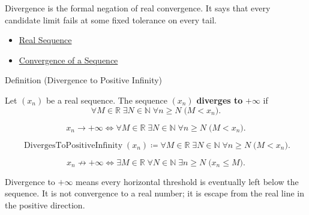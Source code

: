 \begin{remark*}[Interpretation]
Divergence is the formal negation of real convergence. It says that every
candidate limit fails at some fixed tolerance on every tail.
\end{remark*}

\begin{dependencies}
\begin{itemize}
  \item \hyperref[def:real-sequence]{Real Sequence}
  \item \hyperref[def:convergent-sequence]{Convergence of a Sequence}
\end{itemize}
\end{dependencies}


\begin{definitionbox}{Definition (Divergence to Positive Infinity)}
\begin{definition}
\label{def:diverges-to-positive-infinity}
Let $(x_n)$ be a real sequence. The sequence $(x_n)$ \textbf{diverges to}
$+\infty$ if
\[
  \forall M\in\mathbb{R}\;\exists N\in\mathbb{N}\;\forall n\ge N
  \;\bigl(M<x_n\bigr).
\]
\end{definition}
\end{definitionbox}

\begin{remark*}
\[
x_n\to+\infty
\Longleftrightarrow
\forall M\in\mathbb{R}\;\exists N\in\mathbb{N}\;\forall n\ge N
\;\bigl(M<x_n\bigr).
\]
\end{remark*}

\begin{remark*}
\[
\operatorname{DivergesToPositiveInfinity}(x_n)
\coloneqq
\forall M\in\mathbb{R}\;\exists N\in\mathbb{N}\;\forall n\ge N
\;\bigl(M<x_n\bigr).
\]
\end{remark*}

\begin{remark*}
\[
x_n\not\to+\infty
\Longleftrightarrow
\exists M\in\mathbb{R}\;\forall N\in\mathbb{N}\;\exists n\ge N
\;\bigl(x_n\le M\bigr).
\]
\end{remark*}

\begin{remark*}[Interpretation]
Divergence to $+\infty$ means every horizontal threshold is eventually left
below the sequence. It is not convergence to a real number; it is escape from
the real line in the positive direction.
\end{remark*}

